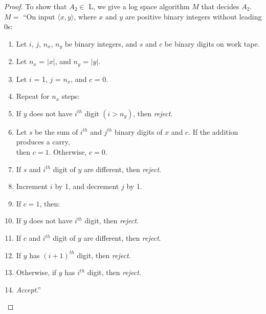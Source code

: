 \documentclass[11pt]{article}
\begin{document}
\begin{proof}
To show that $A_2 \in$ L, we give a log space algorithm $M$ that decides $A_2$. \\

$M =$ \textquotedblleft On input $\langle x, y \rangle$, where $x$ and $y$ are positive binary integers without leading 0s:
\begin{enumerate}
\item Let $i$, $j$, $n_x$, $n_y$ be binary integers, and $s$ and $c$ be binary digits on work tape.
\item Let $n_x$ = $|x|$, and $n_y$ = $|y|$.
\item Let $i$ = 1, $j$ = $n_x$, and $c$ = 0.
\item Repeat for $n_x$ steps:
\item \hspace*{0.5cm} If $y$ does not have $i^{th}$ digit $(i > n_y)$, then \textit{reject}.
\item \hspace*{0.5cm} Let $s$ be the sum of $i^{th}$ and $j^{th}$ binary digits of $x$ and $c$. If the addition produces a carry, \\
\hspace*{0.5cm} then $c = 1$. Otherwise, $c = 0$.
\item \hspace*{0.5cm} If $s$ and $i^{th}$ digit of $y$ are different, then \textit{reject}.
\item \hspace*{0.5cm} Increment $i$ by 1, and decrement $j$ by 1.
\item If $c = 1$, then:
\item \hspace*{0.5cm} If $y$ does not have $i^{th}$ digit, then \textit{reject}.
\item \hspace*{0.5cm} If $c$ and $i^{th}$ digit of $y$ are different, then \textit{reject}.
\item \hspace*{0.5cm} If $y$ has $(i+1)^{th}$ digit, then \textit{reject}.
\item Otherwise, if $y$ has $i^{th}$ digit, then \textit{reject}.
\item \textit{Accept}.\textquotedblright
\end{enumerate}
\end{proof}
\end{document}
